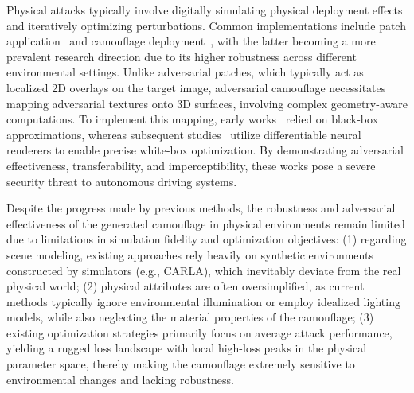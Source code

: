 \documentclass[10pt,journal,compsoc]{IEEEtran}
\begin{document}
Physical attacks typically involve digitally simulating physical deployment effects and iteratively optimizing perturbations. 
Common implementations include patch application~\cite{eykholt2018rp2, brown2017adversarial, hu2021naturalistic} and camouflage deployment~\cite{zhang2018camou, wu2020genetic, wang2024TAS, zhang2023boosting, suryanto2022DTA, suryanto2023ACTIVE, wang2021DAS, wang2022FCA, zhu2024multiview, liang2025grac, liang2025gcac, zhou2025raucae2e, wang2025highly, zhang2025phycamo}, with the latter becoming a more prevalent research direction due to its higher robustness across different environmental settings.
Unlike adversarial patches, which typically act as localized 2D overlays on the target image, adversarial camouflage necessitates mapping adversarial textures onto 3D surfaces, involving complex geometry-aware computations.
To implement this mapping, early works~\cite{zhang2018camou, wu2020genetic} relied on black-box approximations, whereas subsequent studies~\cite{wang2024TAS, zhang2023boosting, suryanto2022DTA, suryanto2023ACTIVE, wang2021DAS, wang2022FCA, zhu2024multiview, liang2025grac, liang2025gcac, zhou2025raucae2e, wang2025highly, zhang2025phycamo} utilize differentiable neural renderers to enable precise white-box optimization. 
By demonstrating adversarial effectiveness, transferability, and imperceptibility, these works pose a severe security threat to autonomous driving systems.

Despite the progress made by previous methods, the robustness and adversarial effectiveness of the generated camouflage in physical environments remain limited due to limitations in simulation fidelity and optimization objectives: 
(1) regarding scene modeling, existing approaches rely heavily on synthetic environments constructed by simulators (e.g., CARLA), which inevitably deviate from the real physical world; 
(2) physical attributes are often oversimplified, as current methods typically ignore environmental illumination or employ idealized lighting models, while also neglecting the material properties of the camouflage; 
(3) existing optimization strategies primarily focus on average attack performance, yielding a rugged loss landscape with local high-loss peaks in the physical parameter space, thereby making the camouflage extremely sensitive to environmental changes and lacking robustness.
\end{document}
